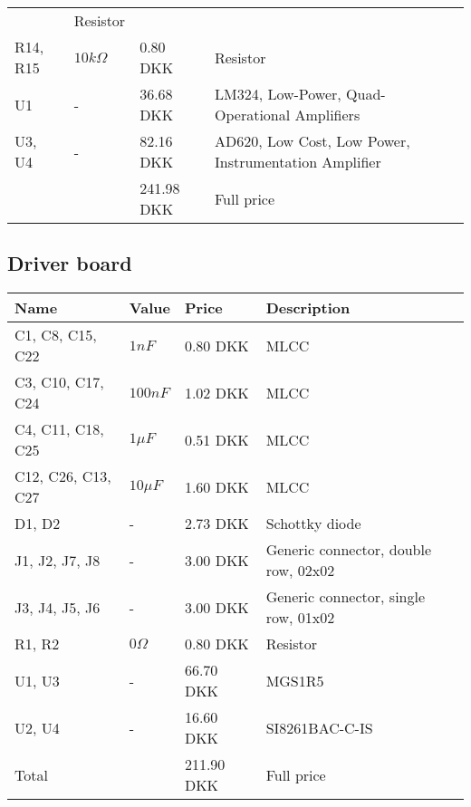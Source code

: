 \begin{table}[H]
\begin{tabular}{|p{4cm} p{1.5cm} p{2.2cm} p{6cm}|}
& Resistor                                            \\
R14, R15                   & $10k \Omega$   & 0.80 DKK
& Resistor                                            \\
U1                         & -              & 36.68 DKK
& LM324, Low-Power, Quad-Operational Amplifiers       \\
U3, U4                     & -              & 82.16 DKK
& AD620, Low Cost, Low Power, Instrumentation Amplifier \\ \hline
& & 241.98 DKK & Full price \\ \hline
\end{tabular}
\end{table}


\subsection{Driver board}
\begin{table}[H]
\centering
\small
\begin{tabular}{|p{4cm} p{1.5cm} p{2.2cm} p{6cm}|} \hline
\textbf{Name}     & \textbf{Value} & \textbf{Price}
& \textbf{Description}                 \\ \hline
C1, C8, C15, C22  & $1nF$       & 0.80 DKK
& MLCC                                 \\
C3, C10, C17, C24 & $100nF$     & 1.02 DKK
& MLCC                                 \\
C4, C11, C18, C25 & $1\mu F$    & 0.51 DKK
& MLCC                                 \\
C12, C26, C13, C27 & $10\mu F$   & 1.60 DKK
& MLCC                                 \\
D1, D2            & -           & 2.73 DKK
& Schottky diode                       \\
J1, J2, J7, J8    & -           & 3.00 DKK
& Generic connector, double row, 02x02 \\
J3, J4, J5, J6    & -           & 3.00 DKK
& Generic connector, single row, 01x02 \\
R1, R2            & $0 \Omega$   & 0.80 DKK
& Resistor                             \\
U1, U3            & -           & 66.70 DKK
& MGS1R5                               \\
U2, U4            & -           & 16.60 DKK
& SI8261BAC-C-IS \\        \hline
Total && 211.90 DKK & Full price  \\ \hline
\end{tabular}
\end{table}


